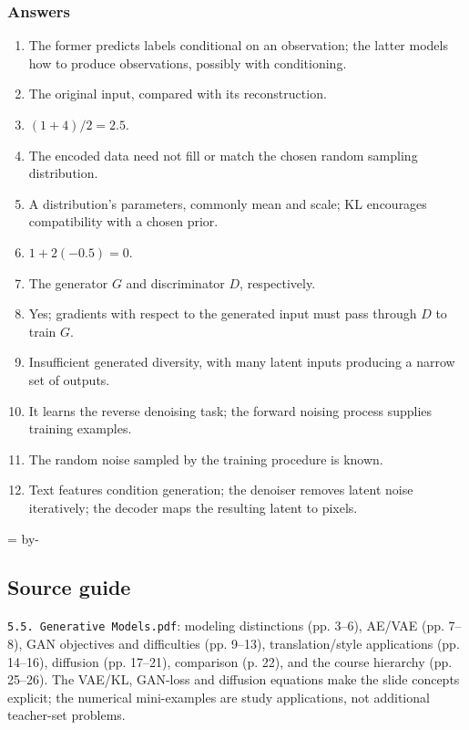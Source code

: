 \documentclass[11pt]{article}
\newcommand{\newsubsection}[1]{\par\begingroup\skip0=\pagegoal\advance\skip0 by-\pagetotal\ifdim\skip0<12\baselineskip\newpage\fi\endgroup\subsection{#1}}
\begin{document}
\subsubsection{Answers}
\begin{enumerate}
\item The former predicts labels conditional on an observation; the latter models how to produce observations, possibly with conditioning.
\item The original input, compared with its reconstruction.
\item $(1+4)/2=2.5$.
\item The encoded data need not fill or match the chosen random sampling distribution.
\item A distribution's parameters, commonly mean and scale; KL encourages compatibility with a chosen prior.
\item $1+2(-0.5)=0$.
\item The generator $G$ and discriminator $D$, respectively.
\item Yes; gradients with respect to the generated input must pass through $D$ to train $G$.
\item Insufficient generated diversity, with many latent inputs producing a narrow set of outputs.
\item It learns the reverse denoising task; the forward noising process supplies training examples.
\item The random noise sampled by the training procedure is known.
\item Text features condition generation; the denoiser removes latent noise iteratively; the decoder maps the resulting latent to pixels.
\end{enumerate}

\newsubsection{Source guide}
\texttt{5.5. Generative Models.pdf}: modeling distinctions (pp. 3--6), AE/VAE (pp. 7--8), GAN objectives and difficulties (pp. 9--13), translation/style applications (pp. 14--16), diffusion (pp. 17--21), comparison (p. 22), and the course hierarchy (pp. 25--26). The VAE/KL, GAN-loss and diffusion equations make the slide concepts explicit; the numerical mini-examples are study applications, not additional teacher-set problems.
\end{document}
